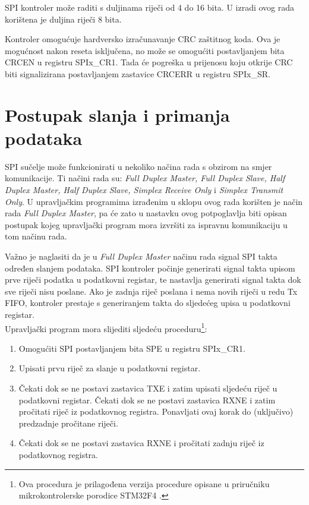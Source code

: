 		SPI kontroler može raditi s duljinama riječi od 4 do 16 bita. U izradi ovog rada korištena je duljina riječi 8 bita.
		
		Kontroler omogućuje hardversko izračunavanje CRC zaštitnog koda. Ova je mogućnost nakon reseta isključena, no može se omogućiti postavljanjem bita CRCEN u registru SPIx\_CR1. Tada će pogreška u prijenosu koju otkrije CRC biti signalizirana postavljanjem zastavice CRCERR u registru SPIx\_SR.
		
	\section{Postupak slanja i primanja podataka}
		
		SPI sučelje može funkcionirati u nekoliko načina rada s obzirom na smjer komunikacije. Ti načini rada su: \textit{Full Duplex Master, Full Duplex Slave, Half Duplex Master, Half Duplex Slave, Simplex Receive Only} i \textit{Simplex Transmit Only}. U upravljačkim programima izrađenim u sklopu ovog rada korišten je način rada \textit{Full Duplex Master}, pa će zato u nastavku ovog potpoglavlja biti opisan postupak kojeg upravljački program mora izvršiti za ispravnu komunikaciju u tom načinu rada.
		
		Važno je naglasiti da je u \textit{Full Duplex Master} načinu rada signal SPI takta određen slanjem podataka. SPI kontroler počinje generirati signal takta upisom prve riječi podatka u podatkovni registar, te nastavlja generirati signal takta dok sve riječi nisu poslane. Ako je zadnja riječ poslana i nema novih riječi u redu Tx FIFO, kontroler prestaje s generiranjem takta do sljedećeg upisa u podatkovni registar. \\
		
		Upravljački program mora slijediti sljedeću proceduru\footnote{Ova procedura je prilagođena verzija procedure opisane u priručniku mikrokontrolerske porodice STM32F4 \cite[str.~887]{stm32f4_manual}.}:
		\begin{enumerate}
			\item Omogućiti SPI postavljanjem bita SPE u registru SPIx\_CR1.
			\item Upisati prvu riječ za slanje u podatkovni registar.
			\item Čekati dok se ne postavi zastavica TXE i zatim upisati sljedeću riječ u podatkovni registar. Čekati dok se ne postavi zastavica RXNE i zatim pročitati riječ iz podatkovnog registra. Ponavljati ovaj korak do (uključivo) predzadnje pročitane riječi.
			\item  Čekati dok se ne postavi zastavica RXNE i pročitati zadnju riječ iz podatkovnog registra.
		\end{enumerate}
	
